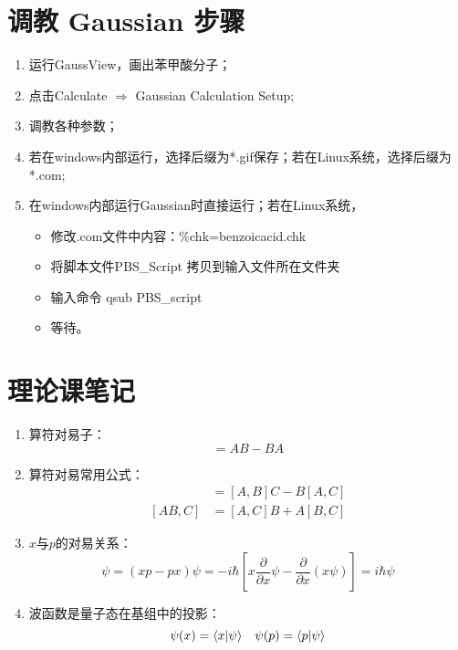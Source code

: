 \section{调教 Gaussian 步骤}
\begin{enumerate}
	\item 运行GaussView，画出苯甲酸分子；
	\item 点击Calculate $\Rightarrow$ Gaussian Calculation Setup;
	\item 调教各种参数；
	\item 若在windows内部运行，选择后缀为*.gif保存；若在Linux系统，选择后缀为*.com;
	\item 在windows内部运行Gaussian时直接运行；若在Linux系统，
	\begin{itemize}
		\item 修改.com文件中内容：\%chk=benzoicacid.chk
		\item 将脚本文件PBS\_Script 拷贝到输入文件所在文件夹
		\item 输入命令 qsub PBS\_script
		\item 等待。
	\end{itemize}
\end{enumerate}

\section{理论课笔记}
\begin{enumerate}
	\subsection{量子的化学}
	\item 算符对易子：
	\begin{equation}
	[A,B] = AB - BA
	\end{equation}

	\item 算符对易常用公式：
	\begin{align}
	[A,BC]& = [A,B]C - B[A,C]\\
	[AB,C]& = [A,C]B + A[B,C]
	\end{align}

	\item $x$与$p$的对易关系：
	\begin{equation}
	[x,p]\psi=(xp-px)\psi = -i\hbar[x \frac{\partial}{\partial x}\psi-\frac{\partial}{\partial x}(x\psi)]= i\hbar \psi
	\end{equation}

	\item 波函数是量子态在基组中的投影：
	\begin{equation}
	\psi (x) = \langle x | \psi \rangle \quad \psi(p) = \langle p | \psi \rangle
	\end{equation} 

\end{enumerate}

